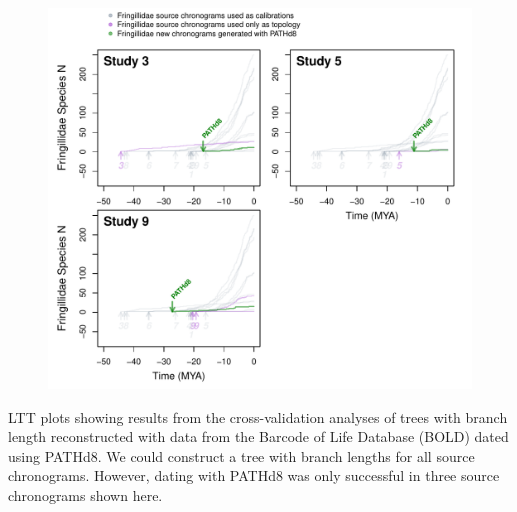\documentclass[
  english,
  man]{apa6}
\begin{document}
\begin{figure}[!h]
\includegraphics{../figures/fig_crossval_boldsumm.pdf}
\caption{}
\label{fig:cvbold}
\end{figure}
LTT plots showing results from the cross-validation analyses of trees with branch length reconstructed with data from the Barcode of Life Database (BOLD) dated using PATHd8. We could construct a tree with branch lengths for all source chronograms. However, dating with PATHd8 was only successful in three source chronograms shown here.

\end{document}

